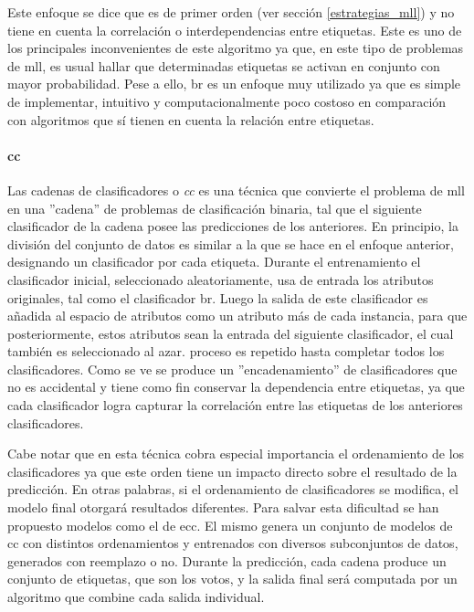 Este enfoque se dice que es de primer orden (ver sección \ref{estrategias_mll})
y no tiene en cuenta la correlación o interdependencias entre etiquetas. Este es
uno de los principales inconvenientes de este algoritmo ya que, en este tipo de
problemas de \acrshort{mll}, es usual hallar que determinadas etiquetas se
activan en conjunto con mayor probabilidad. Pese a ello, \acrshort{br} es un
enfoque muy utilizado \cite{zhang_review_2014} ya que es simple de implementar,
intuitivo y computacionalmente poco costoso en comparación con algoritmos que sí
tienen en cuenta la relación entre etiquetas.  

\paragraph{\acrfull{cc}}

Las cadenas de clasificadores o \textit{\acrlong{cc}}
\cite{read_classifier_2011} es una técnica que convierte el problema de
\acrshort{mll} en una ”cadena” de problemas de clasificación binaria, tal que el
siguiente clasificador de la cadena posee las predicciones de los anteriores. En
principio, la división del conjunto de datos es similar a la que se hace en el
enfoque anterior, designando un clasificador por cada etiqueta. Durante el
entrenamiento el clasificador inicial, seleccionado aleatoriamente, usa de
entrada los atributos originales, tal como el clasificador \acrshort{br}. Luego
la salida de este clasificador es añadida al espacio de atributos como un
atributo más de cada instancia, para que posteriormente, estos atributos sean la
entrada del siguiente clasificador, el cual también es seleccionado al azar.
proceso es repetido hasta completar todos los clasificadores.  Como se ve se
produce un ”encadenamiento” de clasificadores que no es accidental y tiene como
fin conservar la dependencia entre etiquetas, ya que cada clasificador logra
capturar la correlación entre las etiquetas de los anteriores clasificadores. 

Cabe notar que en esta técnica cobra especial importancia el ordenamiento de los
clasificadores ya que este orden tiene un impacto directo sobre el resultado de
la predicción. En otras palabras, si el ordenamiento de clasificadores se
modifica, el modelo final otorgará resultados diferentes. Para salvar esta
dificultad se han propuesto modelos como el de \acrfull{ecc}. El mismo genera un
conjunto de modelos de \acrshort{cc} con distintos ordenamientos y entrenados
con diversos subconjuntos de datos, generados con reemplazo o no. Durante la
predicción, cada cadena produce un conjunto de etiquetas, que son los votos, y
la salida final será computada por un algoritmo que combine cada salida
individual.
 
